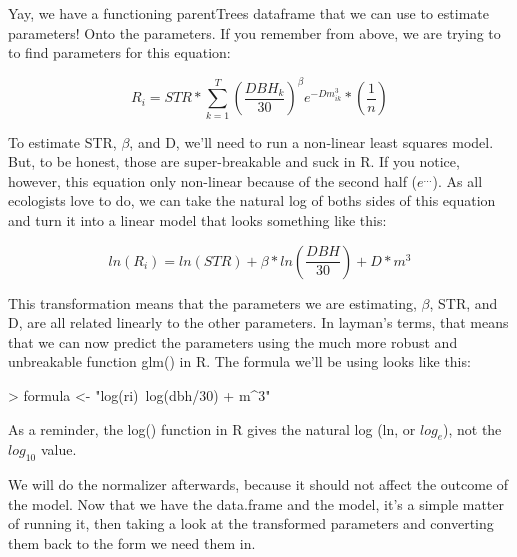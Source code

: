 \documentclass{report}
\begin{document}
Yay, we have a functioning parentTrees dataframe that we can use to estimate parameters! Onto the parameters. If you remember from above, we are trying to to find parameters for this equation:

\begin{equation}
\label{eq:dispersal-repeat}
R_i = STR * \sum\limits_{k=1}^T\left( \frac{DBH_k}{30}\right) ^\beta e^{-Dm_{ik}^3} * \left( \frac{1}{n}\right)
\end{equation}

To estimate STR, $\beta$, and D, we'll need to run a non-linear least squares model. But, to be honest, those are super-breakable and suck in R. If you notice, however, this equation only non-linear because of the second half ($e^{...}$). As all ecologists love to do, we can take the natural log of boths sides of this equation and turn it into a linear model that looks something like this:

\begin{equation}
\label{eq:log-disp}
ln(R_i) = ln(STR) + \beta * ln(\frac{DBH}{30}) + D * m^3
\end{equation}

This transformation means that the parameters we are estimating, $\beta$, STR, and D, are all related linearly to the other parameters. In layman's terms, that means that we can now predict the parameters using the much more robust and unbreakable function glm() in R. The formula we'll be using looks like this:

\begin{Schunk}
\begin{Sinput}
> formula <- "log(ri)~log(dbh/30) + m^3"
\end{Sinput}
\end{Schunk}

As a reminder, the log() function in R gives the natural log (ln, or $log_e$), not the $log_{10}$ value.

We will do the normalizer afterwards, because it should not affect the outcome of the model. Now that we have the data.frame and the model, it's a simple matter of running it, then taking a look at the transformed parameters and converting them back to the form we need them in.
\end{document}
